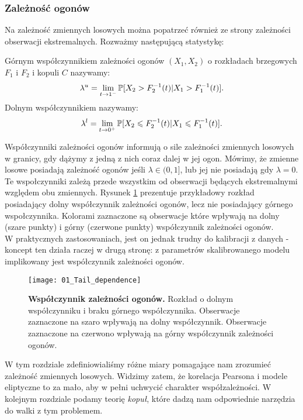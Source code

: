 \subsubsection{Zależność ogonów}
Na zależność zmiennych losowych można popatrzeć również ze strony zależności obserwacji ekstremalnych. Rozważmy następującą statystykę:

\begin{df}
	Górnym współczynnikiem zależności ogonów $(X_1, X_2)$ o rozkładach brzegowych $F_1$ i $F_2$ i kopuli $C$ nazywamy:
	$$ \lambda^{u} = \lim\limits_{t\to1^{-}}\mathbb{P}[X_2 > F_2^{-1}(t) \vert X_1 > F_1^{-1}(t) ].$$
	Dolnym współczynnikiem nazywamy:
	$$ \lambda^{l} = \lim\limits_{t\to0^{+}}\mathbb{P}[X_2 \leqslant F_2^{-1}(t) \vert X_1 \leqslant F_1^{-1}(t) ].$$
\end{df}

Współczynniki zależności ogonów informują o sile zależności zmiennych losowych w granicy, gdy dążymy z jedną z nich coraz dalej w jej ogon. Mówimy, że zmienne losowe posiadają zależność ogonów jeśli $\lambda \in (0, 1]$, lub jej nie posiadają gdy $\lambda =0$. Te wspołczynniki zależą przede wszystkim od obserwacji będących ekstremalnymi względem obu zmiennych. Rysunek \ref{fig:tail_dependence} prezentuje przykładowy rozkład posiadający dolny współczynnik zależności ogonów, lecz nie posiadający górnego wspołczynnika. Kolorami zaznaczone są obserwacje które wpływają na dolny (szare punkty) i górny (czerwone punkty) współczynnik zależności ogonów.\\
W praktycznych zastosowaniach, jest on jednak trudny do kalibracji z danych - koncept ten działa raczej w drugą stronę: z parametrów skalibrowanego modelu implikowany jest współczynnik zależności ogonów.
\begin{figure}[H]
	\centering
	\texttt{[image: 01\_Tail\_dependence]}	
	\caption{\textbf{Współczynnik zależności ogonów.} Rozkład o dolnym współczynniku i braku górnego współczynnika. Obserwacje zaznaczone na szaro wpływają na dolny współczynnik. Obserwacje zaznaczone na czerwono wpływają na górny współczynnik zależności ogonów.\label{fig:tail_dependence}}
\end{figure}

W tym rozdziale zdefiniowialiśmy różne miary pomagające nam zrozumieć zależność zmiennych losowych. Widzimy zatem, że korelacja Pearsona i modele eliptyczne to za mało, aby w pełni uchwycić charakter współzależności. W kolejnym rozdziale podamy teorię \emph{kopuł}, które dadzą nam odpowiednie narzędzia do walki z tym problemem.